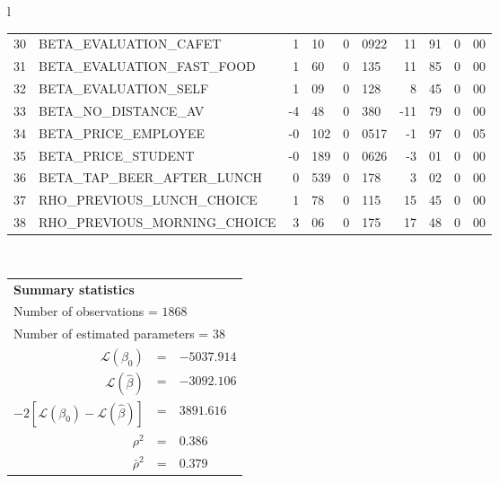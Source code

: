 \begin{tabular}{l}
\begin{tabular}{rlr@{.}lr@{.}lr@{.}lr@{.}l}
30 & BETA_EVALUATION_CAFET & 1&10 & 0&0922 & 11&91 & 0&00\\
31 & BETA_EVALUATION_FAST_FOOD & 1&60 & 0&135 & 11&85 & 0&00\\
32 & BETA_EVALUATION_SELF & 1&09 & 0&128 & 8&45 & 0&00\\
33 & BETA_NO_DISTANCE_AV & -4&48 & 0&380 & -11&79 & 0&00\\
34 & BETA_PRICE_EMPLOYEE & -0&102 & 0&0517 & -1&97 & 0&05\\
35 & BETA_PRICE_STUDENT & -0&189 & 0&0626 & -3&01 & 0&00\\
36 & BETA_TAP_BEER_AFTER_LUNCH & 0&539 & 0&178 & 3&02 & 0&00\\
37 & RHO_PREVIOUS_LUNCH_CHOICE & 1&78 & 0&115 & 15&45 & 0&00\\
38 & RHO_PREVIOUS_MORNING_CHOICE & 3&06 & 0&175 & 17&48 & 0&00\\
\hline
\end{tabular}
\\
\begin{tabular}{rcl}
\multicolumn{3}{l}{\bf Summary statistics}\\
\multicolumn{3}{l}{ Number of observations = $1868$} \\
\multicolumn{3}{l}{ Number of estimated  parameters = $38$} \\
 $\mathcal{L}(\beta_0)$ &=&  $-5037.914$ \\
 $\mathcal{L}(\hat{\beta})$ &=& $-3092.106 $  \\
 $-2[\mathcal{L}(\beta_0) -\mathcal{L}(\hat{\beta})]$ &=& $3891.616$ \\
    $\rho^2$ &=&   $0.386$ \\
    $\bar{\rho}^2$ &=&    $0.379$ \\
\end{tabular}
  \end{tabular}

